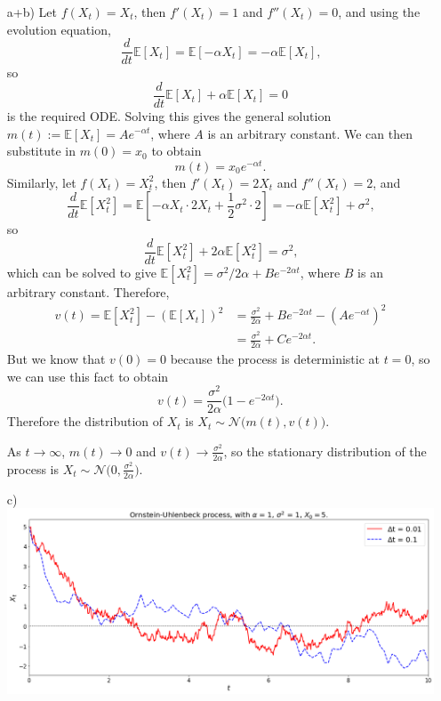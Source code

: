 \documentclass[12pt, twoside, a4paper]{article}
\begin{document}
\begin{enumerate}
\item [a+b)]
Let $f(X_t) = X_t$, then $f'(X_t) = 1$ and $f''(X_t) = 0$, and using the evolution equation, 
\[
\frac{d}{dt} \mathbb{E} [X_t] = \mathbb{E} [ - \alpha X_t ] = - \alpha \mathbb{E} [X_t] \text{,}
\]
so
\[
\frac{d}{dt} \mathbb{E} [X_t] + \alpha \mathbb{E} [X_t] = 0
\]
is the required ODE. 
Solving this gives the general solution $m(t) := \mathbb{E} [X_t] = Ae^{- \alpha t}$, where $A$ is an arbitrary constant. We can then substitute in $m(0) = x_0$ to obtain 
\[
m(t) = x_0 e^{- \alpha t} \text{.}
\]
Similarly, let $f(X_t) = X_t^2$, then $f'(X_t) = 2X_t$ and $f''(X_t) = 2$, and 
\[
\frac{d}{dt} \mathbb{E} [X_t^2] = \mathbb{E} [ - \alpha X_t \cdot 2X_t + \frac{1}{2} \sigma ^2 \cdot 2 ] = - \alpha \mathbb{E} [X_t^2] + \sigma ^2 \text{,}
\]
so
\[
\frac{d}{dt} \mathbb{E} [X_t^2] + 2 \alpha \mathbb{E} [X_t^2] = \sigma ^2 \text{,}
\]
which can be solved to give $\mathbb{E} [X_t^2] = \sigma ^2/2 \alpha + Be^{-2 \alpha t}$, where $B$ is an arbitrary constant. Therefore, 
\begin{align*}
v(t) = \mathbb{E} [X_t^2] - (\mathbb{E} [X_t])^2 &= \frac{\sigma ^2}{2 \alpha} + Be^{-2 \alpha t} - (Ae^{- \alpha t})^2\\
&= \frac{\sigma ^2}{2 \alpha} + Ce^{-2 \alpha t} \text{.}
\end{align*}
But we know that $v(0) = 0$ because the process is deterministic at $t = 0$, so we can use this fact to obtain 
\[
v(t) = \frac{\sigma ^2}{2 \alpha} \big( 1 - e^{-2 \alpha t} \big) \text{.}
\]
Therefore the distribution of $X_t$ is $X_t \sim \mathcal{N} \big( m(t), v(t) \big)$.

As $t \to \infty$, $m(t) \to 0$ and $v(t) \to \tfrac{\sigma ^2}{2 \alpha}$, so the stationary distribution of the process is $X_t \sim \mathcal{N} \big( 0, \tfrac{\sigma ^2}{2 \alpha} \big)$.

\item[c)]
\text{}\\
\hspace*{-2cm}
\includegraphics[width = 190mm]{O-U}

\end{enumerate}
\end{document}
